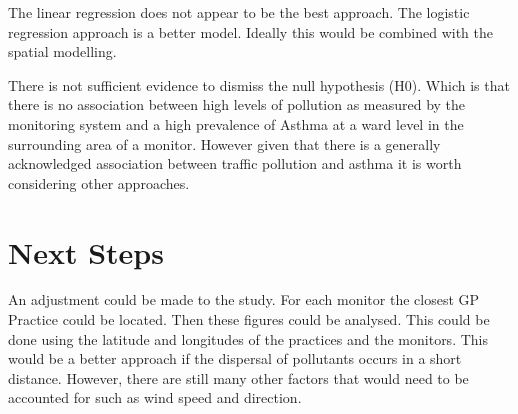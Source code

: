 The linear regression does not appear to be the best approach. The logistic regression approach is a better model. Ideally this would be combined with the spatial modelling. 

There is not sufficient evidence to dismiss the null hypothesis (H0). Which is that there is no association between high levels of pollution as measured by the monitoring system and a high prevalence of Asthma at a ward level in the surrounding area of a monitor. However given that there is a generally acknowledged association between traffic pollution and asthma it is worth considering other approaches. 

\section{Next Steps}
An adjustment could be made to the study. For each monitor the closest GP Practice could be located. Then these figures could be analysed. This could be done using the latitude and longitudes of the practices and the monitors. This would be a better approach if the dispersal of pollutants occurs in a short distance. However, there are still many other factors that would need to be accounted for such as wind speed and direction.
